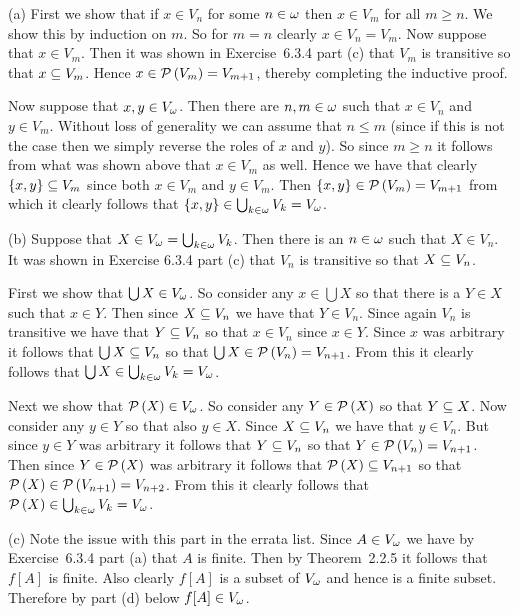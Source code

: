 
\begin{solution}
	(a) First we show that if $x \in V_n$ for some $n \in \w$ then $x \in V_m$ for all $m \geq n$.
    We show this by induction on $m$.
    So for $m=n$ clearly $x \in V_n = V_m$.
    Now suppose that $x \in V_m$.
    Then it was shown in Exercise~6.3.4 part (c) that $V_m$ is transitive so that $x \ss V_m$.
    Hence $x \in \pset{V_m} = V_{m+1}$, thereby completing the inductive proof.

    Now suppose that $x,y \in V_\w$.
    Then  there are $n,m \in \w$ such that $x \in V_n$ and $y \in V_m$.
    Without loss of generality we can assume that $n \leq m$ (since if this is not the case then we simply reverse the roles of $x$ and $y$).
    So since $m \geq n$ it follows from what was shown above that $x \in V_m$ as well.
    Hence we have that clearly $\braces{x,y} \ss V_m$ since both $x \in V_m$  and $y \in V_m$.
    Then $\braces{x,y} \in \pset{V_m} = V_{m+1}$ from which it clearly follows that $\braces{x,y} \in \bigcup_{k \in \w} V_k = V_\w$. \qedsymbol

    (b) Suppose that $X \in V_\w = \bigcup_{k \in \w} V_k$.
    Then there is an $n \in \w$ such that $X \in V_n$.
    It was shown in Exercise 6.3.4 part (c) that $V_n$ is transitive so that $X \ss V_n$.

    First we show that $\bigcup X \in V_\w$.
    So consider any $x \in \bigcup X$ so that there is a $Y \in X$ such that $x \in Y$.
    Then since $X \ss V_n$ we have that $Y \in V_n$.
    Since again $V_n$ is transitive we have that $Y \ss V_n$ so that $x \in V_n$ since $x \in Y$.
    Since $x$ was arbitrary it follows that $\bigcup X \ss V_n$ so that $\bigcup X \in \pset{V_n} = V_{n+1}$.
    From this it clearly follows that  $\bigcup X \in \bigcup_{k \in \w} V_k = V_\w$.

    Next we show that $\pset{X} \in V_\w$.
    So consider any $Y \in \pset{X}$ so that $Y \ss X$.
    Now consider any $y \in Y$ so that also $y \in X$.
    Since $X \ss V_n$ we have that $y \in V_n$.
    But since $y \in Y$ was arbitrary it follows that $Y \ss V_n$ so that $Y \in \pset{V_n} = V_{n+1}$.
    Then since $Y \in \pset{X}$ was arbitrary it follows that $\pset{X} \ss V_{n+1}$ so that $\pset{X} \in \pset{V_{n+1}} = V_{n+2}$.
    From this it clearly follows that  $\pset{X} \in \bigcup_{k \in \w} V_k = V_\w$. \qedsymbol

    (c) Note the issue with this part in the errata list.
    Since $A \in V_\w$ we have by Exercise~6.3.4 part (a) that $A$ is finite.
    Then by Theorem~2.2.5 it follows that $f[A]$ is finite.
    Also clearly $f[A]$ is a subset of $V_\w$ and hence is a finite subset.
    Therefore by part (d) below $f[A] \in V_\w$. \qedsymbol


\end{solution}
